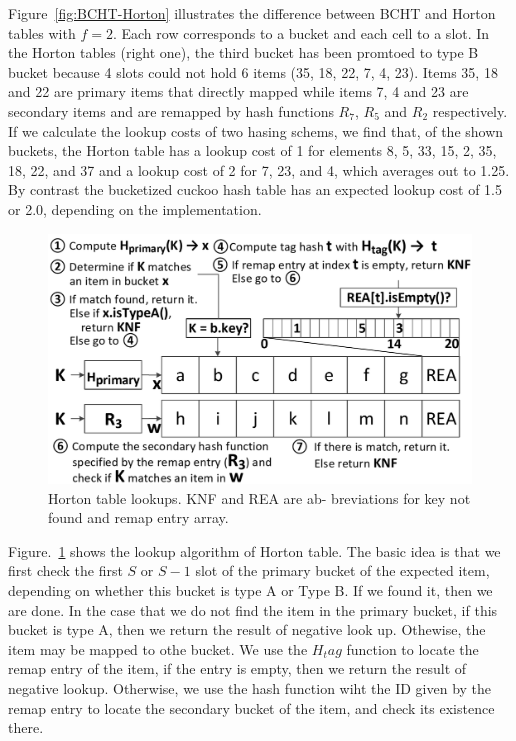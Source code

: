 \documentclass[12pt,conference,compsoc]{IEEEtran}
\begin{document}
Figure~\ref{fig:BCHT-Horton} illustrates the difference between BCHT and Horton tables with $f=2$. Each row corresponds to a bucket and each cell to a slot. In the Horton tables (right one), the third bucket has been promtoed to type B bucket because 4 slots could not hold 6 items (35, 18, 22, 7, 4, 23). Items 35, 18 and 22 are primary items that directly mapped while items 7, 4 and 23 are secondary items and are remapped by hash functions $R_7$, $R_5$ and $R_2$ respectively. If we calculate the lookup costs of two hasing schems, we find that, of the shown buckets, the Horton table has a lookup cost of 1 for elements 8, 5, 33, 15, 2, 35, 18, 22, and 37 and a lookup cost of 2 for 7, 23, and 4, which averages out to 1.25. By contrast the bucketized cuckoo hash table has an expected lookup cost of 1.5 or 2.0, depending on the implementation.

\begin{figure}
    \centering
    \includegraphics[width=\linewidth]{Horton-lookup.png}
    \caption{Horton table lookups. KNF and REA are ab- breviations for key not found and remap entry array.} \label{fig:Horton-lookup}
\end{figure}

Figure.~\ref{fig:Horton-lookup} shows the lookup algorithm of Horton table. The basic idea is that we first check the first $S$ or $S-1$ slot of the primary bucket of the expected item, depending on whether this bucket is type A or Type B. If we found it, then we are done. In the case that we do not find the item in the primary bucket, if this bucket is type A, then we return the result of negative look up. Othewise, the item may be mapped to othe bucket. We use the $H_tag$ function to locate the remap entry of the item, if the entry is empty, then we return the result of negative lookup. Otherwise, we use the hash function wiht the ID given by the remap entry to locate the secondary bucket of the item, and check its existence there.
\end{document}
